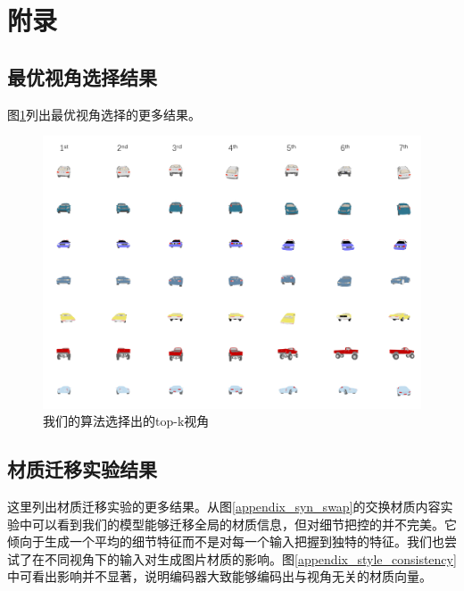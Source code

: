 \documentclass[UTF8,openany,AutoFakeBold,AutoFakeSlant,cs4size]{ctexbook}
\begin{document}


\clearpage


\linespread{1.5}\selectfont
\normalsize
\chapter*{附录}

\section*{最优视角选择结果}

图\ref{appendix_bestview}列出最优视角选择的更多结果。

\begin{figure}
\centering
\includegraphics[width=\linewidth]{./images/bestview_selection.png}
\caption{我们的算法选择出的top-k视角}
\label{appendix_bestview}
\end{figure}

\section*{材质迁移实验结果}

这里列出材质迁移实验的更多结果。从图\ref{appendix_syn_swap}的交换材质内容实验中可以看到我们的模型能够迁移全局的材质信息，但对细节把控的并不完美。它倾向于生成一个平均的细节特征而不是对每一个输入把握到独特的特征。我们也尝试了在不同视角下的输入对生成图片材质的影响。图\ref{appendix_style_consistency}中可看出影响并不显著，说明编码器大致能够编码出与视角无关的材质向量。
\end{document}
